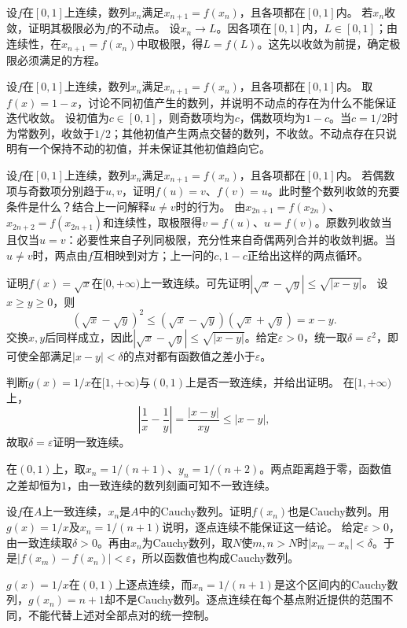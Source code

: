 设\(f\)在\([0,1]\)上连续，数列\(x_n\)满足\(x_{n+1}=f(x_n)\)，且各项都在\([0,1]\)内。
若\(x_n\)收敛，证明其极限必为\(f\)的不动点。
\solutionanswer
设\(x_n\to L\)。因各项在\([0,1]\)内，\(L\in[0,1]\)；由连续性，在\(x_{n+1}=f(x_n)\)中取极限，得\(L=f(L)\)。这先以收敛为前提，确定极限必须满足的方程。


设\(f\)在\([0,1]\)上连续，数列\(x_n\)满足\(x_{n+1}=f(x_n)\)，且各项都在\([0,1]\)内。
取\(f(x)=1-x\)，讨论不同初值产生的数列，并说明不动点的存在为什么不能保证迭代收敛。
\solutionanswer
设初值为\(c\in[0,1]\)，则奇数项均为\(c\)，偶数项均为\(1-c\)。当\(c=1/2\)时为常数列，收敛于\(1/2\)；其他初值产生两点交替的数列，不收敛。不动点存在只说明有一个保持不动的初值，并未保证其他初值趋向它。


设\(f\)在\([0,1]\)上连续，数列\(x_n\)满足\(x_{n+1}=f(x_n)\)，且各项都在\([0,1]\)内。
若偶数项与奇数项分别趋于\(u,v\)，证明\(f(u)=v\)、\(f(v)=u\)。此时整个数列收敛的充要条件是什么？结合上一问解释\(u\ne v\)时的行为。
\solutionanswer
由\(x_{2n+1}=f(x_{2n})\)、\(x_{2n+2}=f(x_{2n+1})\)和连续性，取极限得\(v=f(u)\)、\(u=f(v)\)。原数列收敛当且仅当\(u=v\)：必要性来自子列同极限，充分性来自奇偶两列合并的收敛判据。当\(u\ne v\)时，两点由\(f\)互相映到对方；上一问的\(c,1-c\)正给出这样的两点循环。


证明\(f(x)=\sqrt x\)在\([0,+\infty)\)上一致连续。可先证明\(|\sqrt x-\sqrt y|\le\sqrt{|x-y|}\)。
\solutionanswer
设\(x\ge y\ge0\)，则
\[
(\sqrt x-\sqrt y)^2\le(\sqrt x-\sqrt y)(\sqrt x+\sqrt y)=x-y.
\]
交换\(x,y\)后同样成立，因此\(|\sqrt x-\sqrt y|\le\sqrt{|x-y|}\)。给定\(\varepsilon>0\)，统一取\(\delta=\varepsilon^2\)，即可使全部满足\(|x-y|<\delta\)的点对都有函数值之差小于\(\varepsilon\)。


判断\(g(x)=1/x\)在\([1,+\infty)\)与\((0,1)\)上是否一致连续，并给出证明。
\solutionanswer
在\([1,+\infty)\)上，
\[
\left|\frac1x-\frac1y\right|=\frac{|x-y|}{xy}\le|x-y|,
\]
故取\(\delta=\varepsilon\)证明一致连续。

在\((0,1)\)上，取\(x_n=1/(n+1)\)、\(y_n=1/(n+2)\)。两点距离趋于零，函数值之差却恒为\(1\)，由一致连续的数列刻画可知不一致连续。


设\(f\)在\(A\)上一致连续，\(x_n\)是\(A\)中的Cauchy数列。证明\(f(x_n)\)也是Cauchy数列。用\(g(x)=1/x\)及\(x_n=1/(n+1)\)说明，逐点连续不能保证这一结论。
\solutionanswer
给定\(\varepsilon>0\)，由一致连续取\(\delta>0\)。再由\(x_n\)为Cauchy数列，取\(N\)使\(m,n>N\)时\(|x_m-x_n|<\delta\)。于是\(|f(x_m)-f(x_n)|<\varepsilon\)，所以函数值也构成Cauchy数列。

\(g(x)=1/x\)在\((0,1)\)上逐点连续，而\(x_n=1/(n+1)\)是这个区间内的Cauchy数列，\(g(x_n)=n+1\)却不是Cauchy数列。逐点连续在每个基点附近提供的范围不同，不能代替上述对全部点对的统一控制。
\par
